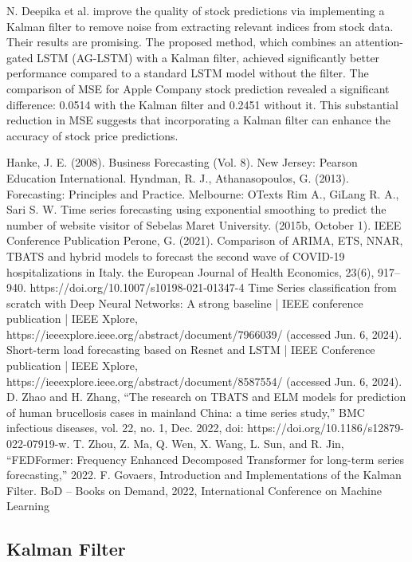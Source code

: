 \documentclass[conference]{IEEEtran}
\begin{document}
N. Deepika et al. \cite{b10} improve the quality of stock predictions via implementing a Kalman filter to remove noise from extracting relevant indices from stock data. Their results are promising. The proposed method, which combines an attention-gated LSTM (AG-LSTM) with a Kalman filter, achieved significantly better performance compared to a standard LSTM model without the filter. The comparison of MSE for Apple Company stock prediction revealed a significant difference: 0.0514 with the Kalman filter and 0.2451 without it. This substantial reduction in MSE suggests that incorporating a Kalman filter can enhance the accuracy of stock price predictions.

 Hanke, J. E. (2008). Business Forecasting (Vol. 8). New Jersey:
Pearson Education International.
 Hyndman, R. J., Athanasopoulos, G. (2013). Forecasting:
Principles and Practice. Melbourne: OTexts
 Rim A., GiLang R. A., Sari S. W. Time series forecasting using exponential smoothing to predict the number of website visitor of Sebelas Maret University. (2015b, October 1). IEEE Conference Publication
Perone, G. (2021). Comparison of ARIMA, ETS, NNAR, TBATS and hybrid models to forecast the second wave of COVID-19 hospitalizations in Italy. the European Journal of Health Economics, 23(6), 917–940. https://doi.org/10.1007/s10198-021-01347-4
Time Series classification from scratch with Deep Neural Networks: A strong baseline | IEEE conference publication | IEEE Xplore, https://ieeexplore.ieee.org/abstract/document/7966039/ (accessed Jun. 6, 2024).
Short-term load forecasting based on Resnet and LSTM | IEEE Conference publication | IEEE Xplore, https://ieeexplore.ieee.org/abstract/document/8587554/ (accessed Jun. 6, 2024).
D. Zhao and H. Zhang, “The research on TBATS and ELM models for prediction of human brucellosis cases in mainland China: a time series study,” BMC infectious diseases, vol. 22, no. 1, Dec. 2022, doi: https://doi.org/10.1186/s12879-022-07919-w.
T. Zhou, Z. Ma, Q. Wen, X. Wang, L. Sun, and R. Jin, “FEDFormer: Frequency Enhanced Decomposed Transformer for long-term series forecasting,” 2022.
F. Govaers, Introduction and Implementations of the Kalman Filter. BoD – Books on Demand, 2022, International Conference on Machine Learning

\subsection{Kalman Filter}
\end{document}
